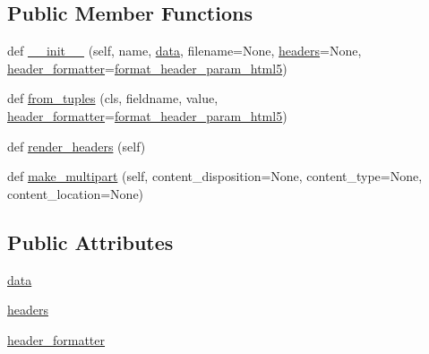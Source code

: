 \subsection*{Public Member Functions}
\begin{DoxyCompactItemize}
\item 
def \hyperlink{classpip_1_1__vendor_1_1urllib3_1_1fields_1_1RequestField_a5d21d86e38c7dceb0f9731ea4827b3e9}{\+\_\+\+\_\+init\+\_\+\+\_\+} (self, name, \hyperlink{classpip_1_1__vendor_1_1urllib3_1_1fields_1_1RequestField_a0dc5be6a68c049cfe1e8422d1aacbf24}{data}, filename=None, \hyperlink{classpip_1_1__vendor_1_1urllib3_1_1fields_1_1RequestField_a8773d305539dd8323bfae16bbc529fe2}{headers}=None, \hyperlink{classpip_1_1__vendor_1_1urllib3_1_1fields_1_1RequestField_a6fd496fce1bf6585e7b0a6b3fb1f0bb6}{header\+\_\+formatter}=\hyperlink{namespacepip_1_1__vendor_1_1urllib3_1_1fields_a969066e8f71fd6c85bcfa7d6a81752a0}{format\+\_\+header\+\_\+param\+\_\+html5})
\item 
def \hyperlink{classpip_1_1__vendor_1_1urllib3_1_1fields_1_1RequestField_a8ffd57529618e1541b63ad3743feec13}{from\+\_\+tuples} (cls, fieldname, value, \hyperlink{classpip_1_1__vendor_1_1urllib3_1_1fields_1_1RequestField_a6fd496fce1bf6585e7b0a6b3fb1f0bb6}{header\+\_\+formatter}=\hyperlink{namespacepip_1_1__vendor_1_1urllib3_1_1fields_a969066e8f71fd6c85bcfa7d6a81752a0}{format\+\_\+header\+\_\+param\+\_\+html5})
\item 
def \hyperlink{classpip_1_1__vendor_1_1urllib3_1_1fields_1_1RequestField_a86767d68b66029d734d1338c6c52bfeb}{render\+\_\+headers} (self)
\item 
def \hyperlink{classpip_1_1__vendor_1_1urllib3_1_1fields_1_1RequestField_a559f2c3dbfea2a1ee1e26240b8510d22}{make\+\_\+multipart} (self, content\+\_\+disposition=None, content\+\_\+type=None, content\+\_\+location=None)
\end{DoxyCompactItemize}
\subsection*{Public Attributes}
\begin{DoxyCompactItemize}
\item 
\hyperlink{classpip_1_1__vendor_1_1urllib3_1_1fields_1_1RequestField_a0dc5be6a68c049cfe1e8422d1aacbf24}{data}
\item 
\hyperlink{classpip_1_1__vendor_1_1urllib3_1_1fields_1_1RequestField_a8773d305539dd8323bfae16bbc529fe2}{headers}
\item 
\hyperlink{classpip_1_1__vendor_1_1urllib3_1_1fields_1_1RequestField_a6fd496fce1bf6585e7b0a6b3fb1f0bb6}{header\+\_\+formatter}
\end{DoxyCompactItemize}


